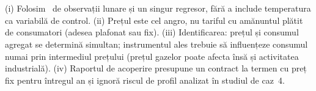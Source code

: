 \section{}
%
{(i) Folosim \NnMonths\ de observații lunare și un singur regresor, fără a include temperatura ca variabilă de control. (ii) Prețul este cel angro, nu tariful cu amănuntul plătit de consumatori (adesea plafonat sau fix).
(iii) Identificarea: prețul și consumul agregat se determină simultan; instrumentul ales trebuie să influențeze consumul numai prin intermediul prețului (prețul gazelor poate afecta însă și activitatea industrială).
(iv) Raportul de acoperire presupune un contract la termen cu preț fix pentru întregul an și ignoră riscul de profil analizat în studiul de caz~4.}

\newpage
